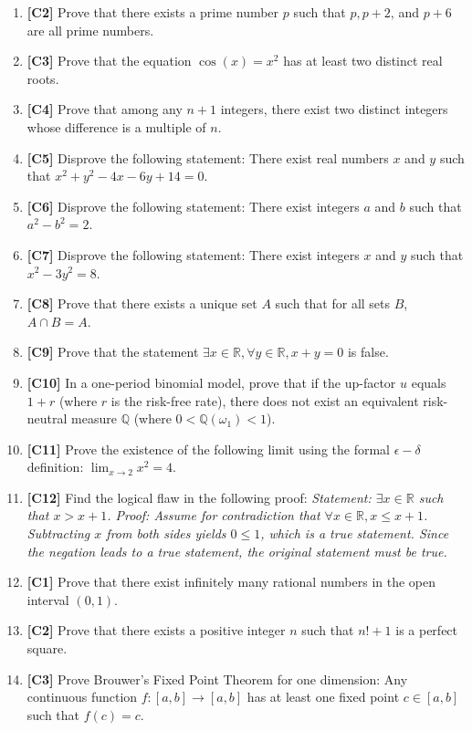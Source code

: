 \documentclass[11pt]{article}
\begin{document}
\begin{enumerate}
    \item \textbf{[C2]} Prove that there exists a prime number $p$ such that $p, p+2$, and $p+6$ are all prime numbers.
    \item \textbf{[C3]} Prove that the equation $\cos(x) = x^2$ has at least two distinct real roots.
    \item \textbf{[C4]} Prove that among any $n+1$ integers, there exist two distinct integers whose difference is a multiple of $n$.
    \item \textbf{[C5]} Disprove the following statement: There exist real numbers $x$ and $y$ such that $x^2 + y^2 - 4x - 6y + 14 = 0$.
    \item \textbf{[C6]} Disprove the following statement: There exist integers $a$ and $b$ such that $a^2 - b^2 = 2$.
    \item \textbf{[C7]} Disprove the following statement: There exist integers $x$ and $y$ such that $x^2 - 3y^2 = 8$.
    \item \textbf{[C8]} Prove that there exists a unique set $A$ such that for all sets $B$, $A \cap B = A$.
    \item \textbf{[C9]} Prove that the statement $\exists x \in \mathbb{R}, \forall y \in \mathbb{R}, x + y = 0$ is false.
    \item \textbf{[C10]} In a one-period binomial model, prove that if the up-factor $u$ equals $1+r$ (where $r$ is the risk-free rate), there does not exist an equivalent risk-neutral measure $\mathbb{Q}$ (where $0 < \mathbb{Q}(\omega_1) < 1$).
    \item \textbf{[C11]} Prove the existence of the following limit using the formal $\epsilon-\delta$ definition: $\lim_{x \to 2} x^2 = 4$.
    \item \textbf{[C12]} Find the logical flaw in the following proof: \textit{Statement: $\exists x \in \mathbb{R}$ such that $x > x+1$. Proof: Assume for contradiction that $\forall x \in \mathbb{R}, x \le x+1$. Subtracting $x$ from both sides yields $0 \le 1$, which is a true statement. Since the negation leads to a true statement, the original statement must be true.}
    \item \textbf{[C1]} Prove that there exist infinitely many rational numbers in the open interval $(0, 1)$.
    \item \textbf{[C2]} Prove that there exists a positive integer $n$ such that $n! + 1$ is a perfect square.
    \item \textbf{[C3]} Prove Brouwer's Fixed Point Theorem for one dimension: Any continuous function $f: [a, b] \to [a, b]$ has at least one fixed point $c \in [a, b]$ such that $f(c) = c$.

\end{enumerate}
\end{document}
